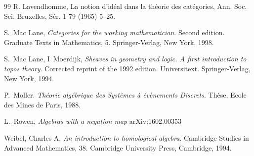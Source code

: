 \documentclass[12pt]{article}
\begin{document}
\begin{thebibliography}{99}
 R. Lavendhomme, La notion d'id\' eal dans la th\' eorie des cat\' egories, Ann. Soc. Sci. Bruxelles, S\' er. 1 79 (1965) 5--25.

 S.~Mac Lane, {\em Categories for the working mathematician}. Second edition. Graduate Texts in Mathematics, 5. Springer-Verlag, New York, 1998.

 S.~Mac Lane, I~Moerdijk, {\em Sheaves in geometry and logic. A first introduction to topos theory}. Corrected reprint of the 1992 edition. Universitext. Springer-Verlag, New York, 1994.




 P.~Moller. {\em Th\' eorie alg\' ebrique des Syst\`emes \`a \' ev\`enements Discrets}. Th\`ese, Ecole des Mines de Paris,
1988.










 L.~Rowen,  {\em Algebras with a negation map} arXiv:1602.00353




 Weibel, Charles A. {\em An introduction to homological algebra}. Cambridge Studies in Advanced Mathematics, 38. Cambridge University Press, Cambridge, 1994. 





\end{thebibliography}
\end{document}
